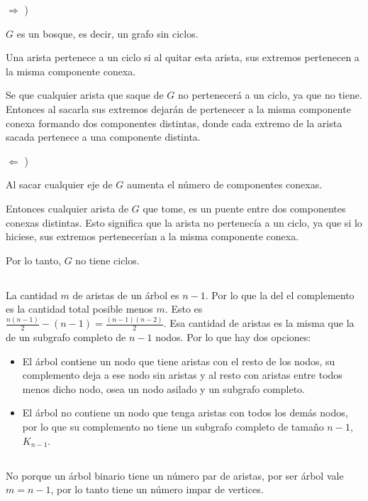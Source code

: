 $\Longrightarrow$ )

$G$ es un bosque, es decir, un grafo sin ciclos. 

Una arista pertenece a un ciclo si al quitar esta arista, sus extremos pertenecen a la misma componente conexa.

Se que cualquier arista que saque de $G$ no pertenecerá a un ciclo, ya que no tiene. Entonces al sacarla sus extremos dejarán de pertenecer a la misma componente conexa formando dos componentes distintas, donde cada extremo de la arista sacada pertenece a una componente distinta.

$\Longleftarrow$ )

Al sacar cualquier eje de $G$ aumenta el número de componentes conexas. 

Entonces cualquier arista de $G$ que tome, es un puente entre dos componentes conexas distintas. Esto significa que la arista no pertenecía a un ciclo, ya que si lo hiciese, sus extremos pertenecerían a la misma componente conexa. 

Por lo tanto, $G$ no tiene ciclos.

\subsection{}
La cantidad $m$ de aristas de un árbol es $n - 1$. Por lo que la del el complemento es la cantidad total posible menos $m$. Esto es $\frac{n(n - 1)}{2} - (n - 1) = \frac{(n - 1)(n - 2)}{2}$. Esa cantidad de aristas es la misma que la de un subgrafo completo de $n - 1$ nodos. Por lo que hay dos opciones:

\begin{itemize}
\item 
El árbol contiene un nodo que tiene aristas con el resto de los nodos, su complemento deja a ese nodo sin aristas y al resto con aristas entre todos menos dicho nodo, osea un nodo asilado y un subgrafo completo.

\item
El árbol no contiene un nodo que tenga aristas con todos los demás nodos, por lo que su complemento no tiene un subgrafo completo de tamaño $n - 1$, $K_{n-1}$.
\end{itemize}

\setcounter{subsection}{8}
\subsection{}

\subsubsection{}
No porque un árbol binario tiene un número par de aristas, por ser árbol vale $m = n - 1$, por lo tanto tiene un número impar de vertices.

